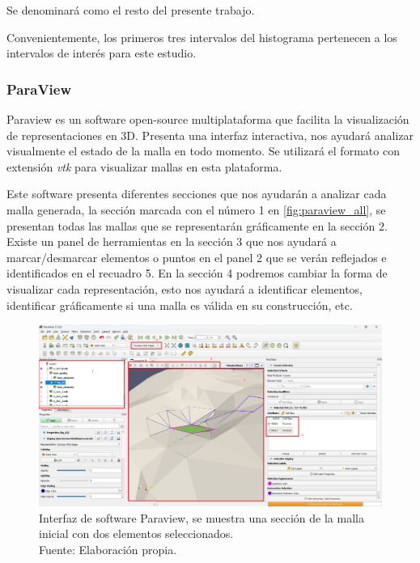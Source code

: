 Se denominará como \jens{} el resto del presente trabajo.

Convenientemente, los primeros tres intervalos del histograma pertenecen a los intervalos de interés para este estudio.

\subsubsection{ParaView}

Paraview es un software open-source multiplataforma que facilita la visualización de representaciones en 3D. Presenta una interfaz interactiva, nos ayudará analizar visualmente el estado de la malla en todo momento. Se utilizará el formato con extensión \textit{vtk} para visualizar mallas en esta plataforma.

Este software presenta diferentes secciones que nos ayudarán a analizar cada malla generada, la sección marcada con el número 1 en \autoref{fig:paraview_all}, se presentan todas las mallas que se representarán gráficamente en la sección 2. Existe un panel de herramientas en la sección 3 que nos ayudará a marcar/desmarcar elementos o puntos en el panel 2 que se verán reflejados e identificados en el recuadro 5.
En la sección 4 podremos cambiar la forma de visualizar cada representación, esto nos ayudará a identificar elementos, identificar gráficamente si una malla es válida en su construcción, etc.

\begin{figure}[H]
    \centering
    \includegraphics[width=1.0\textwidth]{figures/paraview/paraview_all.png}
    \caption{ Interfaz de software Paraview, se muestra una sección de la malla inicial con dos elementos seleccionados.\\  Fuente: Elaboración propia.}
    \label{fig:paraview_all}
\end{figure}


